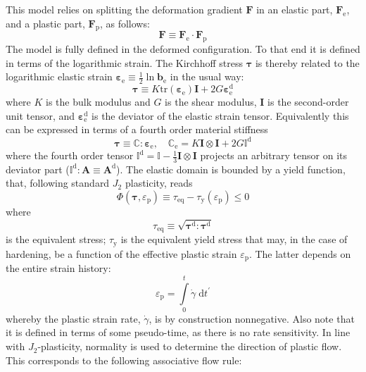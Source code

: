 \documentclass{goose-article}
\newcommand\T[1]{\bm{{#1}}}
\newcommand\TT[1]{\mathbb{{#1}}}
\begin{document}
This model relies on splitting the deformation gradient $\T{F}$ in an elastic part, $\T{F}_\mathrm{e}$, and a plastic part, $\T{F}_\mathrm{p}$, as follows:
\begin{equation}
  \T{F} \equiv \T{F}_\mathrm{e} \cdot \T{F}_\mathrm{p}
\end{equation}
The model is fully defined in the deformed configuration. To that end it is defined in terms of the logarithmic strain. The Kirchhoff stress $\T{\tau}$ is thereby related to the logarithmic elastic strain $\T{\varepsilon}_\mathrm{e} \equiv \tfrac{1}{2} \ln \T{b}_\mathrm{e}$ in the usual way:
\begin{equation}
  \T{\tau} \equiv K \mathrm{tr} \left( \T{\varepsilon}_\mathrm{e} \right) \T{I} + 2 G \T{\varepsilon}_\mathrm{e}^\mathrm{d}
\end{equation}
where $K$ is the bulk modulus and $G$ is the shear modulus, $\T{I}$ is the second-order unit tensor, and $\T{\varepsilon}_\mathrm{e}^\mathrm{d}$ is the deviator of the elastic strain tensor. Equivalently this can be expressed in terms of a fourth order material stiffness
\begin{equation}
  \T{\tau} \equiv \TT{C} : \T{\varepsilon}_\mathrm{e},
  \quad
  \TT{C}_\mathrm{e} = K \T{I} \otimes \T{I} + 2 G \TT{I}^\mathrm{d}
  \label{eq:tangent:elas}
\end{equation}
where the fourth order tensor $\TT{I}^\mathrm{d} = \TT{I} - \tfrac{1}{3} \T{I} \otimes \T{I}$ projects an arbitrary tensor on its deviator part ($\TT{I}^\mathrm{d} : \T{A} \equiv \T{A}^\mathrm{d}$). The elastic domain is bounded by a yield function, that, following standard $J_2$ plasticity, reads
\begin{equation}
  \Phi(\T{\tau}, \varepsilon_\mathrm{p}) \equiv \tau_\mathrm{eq} - \tau_\mathrm{y}(\varepsilon_\mathrm{p}) \leq 0
\end{equation}
where
\begin{equation}
  \tau_\mathrm{eq} \equiv \sqrt{ \T{\tau}^\mathrm{d} : \T{\tau}^\mathrm{d} }
\end{equation}
is the equivalent stress; $\tau_\mathrm{y}$ is the equivalent yield stress that may, in the case of hardening, be a function of the effective plastic strain $\varepsilon_\mathrm{p}$. The latter depends on the entire strain history:
\begin{equation}
  \varepsilon_\mathrm{p} = \int\limits_0^t \dot{\gamma} \;\mathrm{d}t^\prime
  \label{eq:history}
\end{equation}
whereby the plastic strain rate, $\dot{\gamma}$, is by construction nonnegative. Also note that it is defined in terms of some pseudo-time, as there is no rate sensitivity. In line with $J_2$-plasticity, normality is used to determine the direction of plastic flow. This corresponds to the following associative flow rule:
\end{document}
